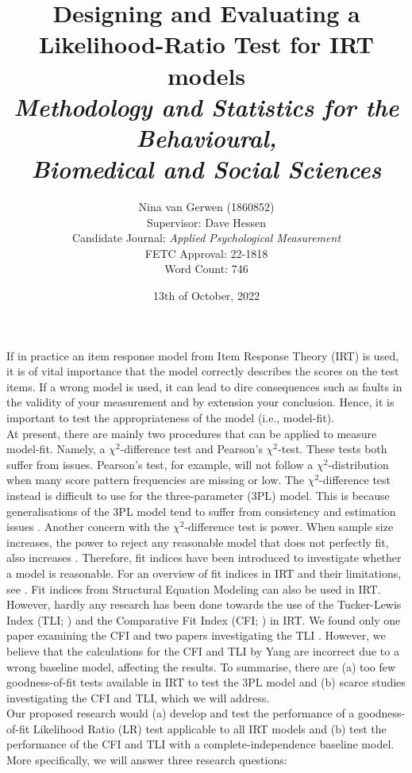 \documentclass[Afour, sageapa, times]{sagej}
\title{%
	Designing and Evaluating a Likelihood-Ratio Test for IRT models \\
	\large \textit{Methodology and Statistics for the Behavioural, \\
	Biomedical and Social Sciences}}
\author{Nina van Gerwen (1860852) \\ 
	Supervisor: Dave Hessen \\ 
	\small {Candidate Journal: \textit{Applied Psychological Measurement}} \\
	\small {FETC Approval: 22-1818} \\
	\small {Word Count: 746}}
\date{13th of October, 2022}
\begin{document}
\maketitle

\newpage

\section{}
\indent If in practice an item response model from Item Response Theory (IRT) is used, it is of vital importance that the model correctly describes the scores on the test items. If a wrong model is used, it can lead to dire consequences such as faults in the validity of your measurement \autocite{consq1, consq2, consq3} and by extension your conclusion. Hence, it is important to test the appropriateness of the model (i.e., model-fit). \\
\indent At present, there are mainly two procedures that can be applied to measure model-fit. Namely, a $\chi^2$-difference test and Pearson's $\chi^2$-test. These tests both suffer from issues. Pearson's test, for example, will not follow a $\chi^2$-distribution when many score pattern frequencies are missing or low. The $\chi^2$-difference test instead is difficult to use for the three-parameter (3PL) model. This is because generalisations of the 3PL model tend to suffer from consistency and estimation issues \autocite{4plconsist1, 4plconsist2}. Another concern with the $\chi^2$-difference test is power. When sample size increases, the power to reject any reasonable model that does not perfectly fit, also increases \autocite{chi2sens}. Therefore, fit indices have been introduced to investigate whether a model is reasonable. For an overview of fit indices in IRT and their limitations, see \textcite{ref1}. Fit indices from Structural Equation Modeling can also be used in IRT. However, hardly any research has been done towards the use of the Tucker-Lewis Index (TLI; \cite{tli}) and the Comparative Fit Index (CFI; \cite{cfi}) in IRT. We found only one paper examining the CFI \autocite{yangfitindex} and two papers investigating the TLI \autocite{yangfitindex, tliirt}. However, we believe that the calculations for the CFI and TLI by Yang are incorrect due to a wrong baseline model, affecting the results. To summarise, there are (a) too few goodness-of-fit tests available in IRT to test the 3PL model and (b) scarce studies investigating the CFI and TLI, which we will address. \\
\indent Our proposed research would (a) develop and test the performance of a goodness-of-fit Likelihood Ratio (LR) test applicable to all IRT models and (b) test the performance of the CFI and TLI with a complete-independence baseline model. More specifically, we will answer three research questions:
\end{document}
